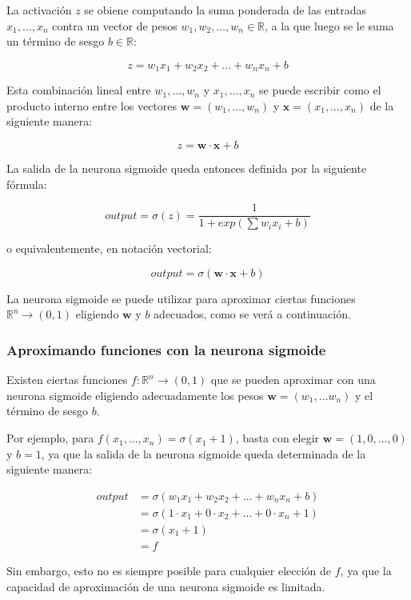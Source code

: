 \documentclass[a4paper, 10pt, twoside]{article}
\begin{document}
La activación $z$ se obiene computando la suma ponderada de las entradas $x_1,
\ldots, x_n$ contra un vector de pesos $w_1, w_2, \ldots, w_n \in \mathbb{R}$,
a la que luego se le suma un término de sesgo $b \in \mathbb{R}$:

$$z = w_1 x_1 + w_2 x_2 + \ldots + w_n x_n + b$$

Esta combinación lineal entre $w_1, \ldots, w_n$ y $x_1, \ldots, x_n$ se puede
escribir como el producto interno entre los vectores $\bm{w} = (w_1, \ldots,
w_n)$ y $\bm{x} = (x_1, \ldots, x_n)$ de la siguiente manera:

$$z = \bm{w} \cdot \bm{x} + b$$

La salida de la neurona sigmoide queda entonces definida por la siguiente
fórmula:

$$\mathit{output} = \sigma(z) = \frac{1}{1 + exp(\sum w_i x_i + b)}$$

o equivalentemente, en notación vectorial:

$$\mathit{output} = \sigma(\bm{w} \cdot \bm{x} + b)$$

La neurona sigmoide se puede utilizar para aproximar ciertas funciones
$\mathbb{R}^n \rightarrow (0, 1)$ eligiendo $\bm{w}$ y $b$ adecuados, como se
verá a continuación.


\subsubsection{Aproximando funciones con la neurona sigmoide}

Existen ciertas funciones $f : \mathbb{R}^n \rightarrow (0, 1)$ que se pueden
aproximar con una neurona sigmoide eligiendo adecuadamente los pesos $\bm{w} =
(w_1, \ldots w_n)$ y el término de sesgo $b$.

Por ejemplo, para $f(x_1, \ldots, x_n) = \sigma(x_1 + 1)$, basta con elegir
$\bm{w} = (1, 0, \ldots, 0)$ y $b = 1$, ya que la salida de la neurona sigmoide
queda determinada de la siguiente manera:

\begin{align*}
  \mathit{output} & = \sigma(w_1 x_1 + w_2 x_2 + \ldots + w_n x_n + b) \\
                  & = \sigma(1 \cdot x_1 + 0 \cdot x_2 + \ldots + 0 \cdot x_n
                             + 1) \\
                  & = \sigma(x_1 + 1) \\
                  & = f
\end{align*}

Sin embargo, esto no es siempre posible para cualquier elección de $f$, ya que
la capacidad de aproximación de una neurona sigmoide es limitada.
\end{document}
